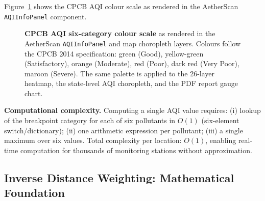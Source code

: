 \documentclass[12pt,a4paper]{article}
\begin{document}
Figure~\ref{fig:aqicolors} shows the CPCB AQI colour scale as rendered in
the AetherScan \texttt{AQIInfoPanel} component.

\begin{figure}[H]
\centering
{}
\caption[CPCB AQI colour scale as used in AetherScan UI]{%
  \textbf{CPCB AQI six-category colour scale} as rendered in the
  AetherScan \texttt{AQIInfoPanel} and map choropleth layers.
  Colours follow the CPCB 2014 specification: green (Good),
  yellow-green (Satisfactory), orange (Moderate), red (Poor),
  dark red (Very Poor), maroon (Severe). The same palette is
  applied to the 26-layer heatmap, the state-level AQI choropleth,
  and the PDF report gauge chart.}
\label{fig:aqicolors}
\end{figure}

\noindent\textbf{Computational complexity.}
Computing a single AQI value requires: (i) lookup of the breakpoint category
for each of six pollutants in $O(1)$ (six-element switch/dictionary); (ii)
one arithmetic expression per pollutant; (iii) a single maximum over six values.
Total complexity per location: $O(1)$, enabling real-time computation for
thousands of monitoring stations without approximation.

\subsection{Inverse Distance Weighting: Mathematical Foundation}
\label{sec:background:idw}
\end{document}
